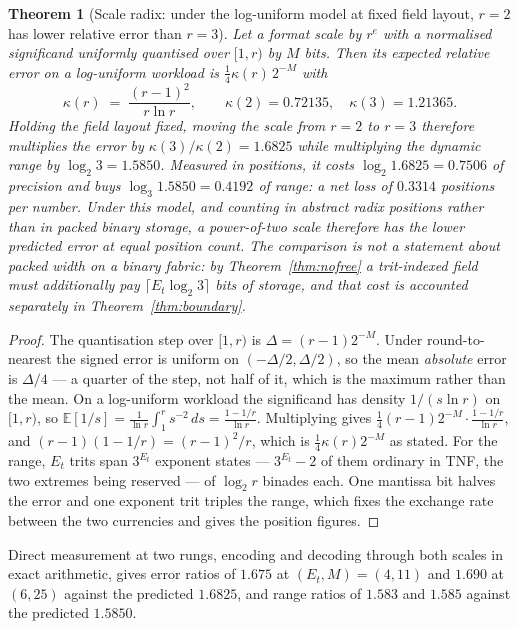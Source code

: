 \documentclass[11pt]{article}
\newtheorem{theorem}{Theorem}
\theoremstyle{definition}
\begin{document}
\begin{theorem}[Scale radix: under the log-uniform model at fixed field layout,
$r=2$ has lower relative error than $r=3$]
\label{thm:scaleradix}
Let a format scale by $r^{e}$ with a normalised significand uniformly quantised
over $[1, r)$ by $M$ bits. Then its expected relative error on a log-uniform
workload is $\tfrac14\kappa(r)\,2^{-M}$ with
\[
\kappa(r) \;=\; \frac{(r-1)^{2}}{r\ln r},
\qquad \kappa(2) = 0.72135,\quad \kappa(3) = 1.21365 .
\]
Holding the field layout fixed, moving the scale from $r=2$ to $r=3$ therefore
multiplies the error by $\kappa(3)/\kappa(2) = 1.6825$ while multiplying the
dynamic range by $\log_2 3 = 1.5850$. Measured in positions, it costs
$\log_2 1.6825 = 0.7506$ of precision and buys $\log_3 1.5850 = 0.4192$ of range:
a net loss of $0.3314$ positions per number. Under this model, and counting in
abstract radix positions rather than in packed binary storage, a power-of-two
scale therefore has the lower predicted error at equal position count. The
comparison is not a statement about packed width on a binary fabric: by
Theorem~\ref{thm:nofree} a trit-indexed field must additionally pay
$\lceil E_t\log_2 3\rceil$ bits of storage, and that cost is accounted separately
in Theorem~\ref{thm:boundary}.
\end{theorem}

\begin{proof}
The quantisation step over $[1,r)$ is $\Delta = (r-1)2^{-M}$. Under
round-to-nearest the signed error is uniform on $(-\Delta/2, \Delta/2)$, so the
mean \emph{absolute} error is $\Delta/4$ --- a quarter of the step, not half of
it, which is the maximum rather than the mean. On a log-uniform workload the
significand has density $1/(s\ln r)$ on $[1,r)$, so
$\mathbb{E}[1/s] = \frac{1}{\ln r}\int_1^{r} s^{-2}\,ds = \frac{1-1/r}{\ln r}$.
Multiplying gives $\tfrac14 (r-1)2^{-M}\cdot\frac{1-1/r}{\ln r}$, and
$(r-1)(1-1/r) = (r-1)^2/r$, which is $\tfrac14\kappa(r)2^{-M}$ as stated. For
the range, $E_t$ trits span $3^{E_t}$ exponent states --- $3^{E_t}-2$ of them
ordinary in TNF, the two extremes being reserved --- of $\log_2 r$ binades each. One
mantissa bit halves the error and one exponent trit triples the range, which
fixes the exchange rate between the two currencies and gives the position
figures.
\end{proof}

Direct measurement at two rungs, encoding and decoding through both scales in
exact arithmetic, gives error ratios of $1.675$ at $(E_t,M) = (4,11)$ and $1.690$
at $(6,25)$ against the predicted $1.6825$, and range ratios of $1.583$ and
$1.585$ against the predicted $1.5850$.
\end{document}
